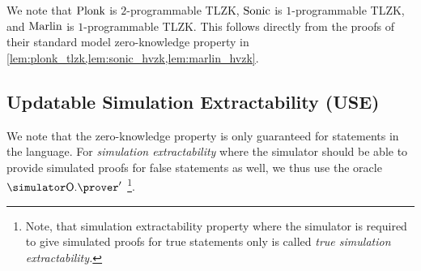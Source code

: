 We note that $\textnormal{{Plonk}}$ is $2$-programmable TLZK, ${\textnormal{{Sonic}}}$ is $1$-programmable TLZK,
and ${\textnormal{{Marlin}}}$ is $1$-programmable TLZK. This follows directly from the proofs of
their standard model zero-knowledge property in
\cref{lem:plonk_tlzk,lem:sonic_hvzk,lem:marlin_hvzk}.

\subsection{Updatable Simulation Extractability (USE)}
We note that the zero-knowledge property is only guaranteed for statements in the
language.
For \emph{simulation extractability} where the simulator
should be able to provide simulated proofs for false statements as well, we thus use the oracle $\simOP'$
\footnote{Note,
  that simulation extractability property where the simulator is required to give
  simulated proofs for true statements only is called \emph{true simulation
    extractability.}}. 
	
%



